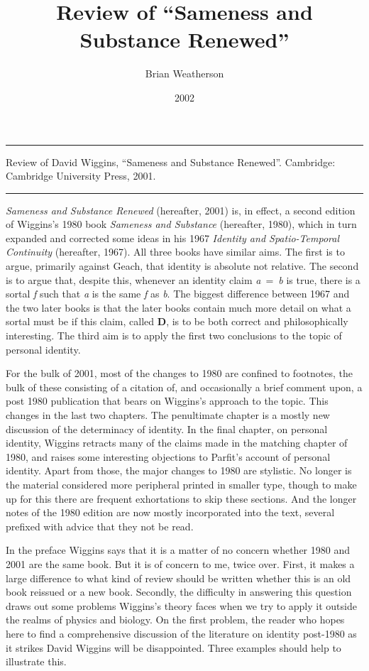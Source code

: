 \documentclass[
  10pt,
  letterpaper,
  DIV=11,
  numbers=noendperiod,
  twoside]{scrartcl}
\title{Review of ``Sameness and Substance Renewed''}
\author{Brian Weatherson}
\date{2002}
\renewenvironment{abstract}
 {\vspace{-1.25cm}
 \quotation\small\noindent\rule{\linewidth}{.5pt}\par\smallskip
 \noindent }
 {\par\noindent\rule{\linewidth}{.5pt}\endquotation}
\begin{document}
\maketitle
\begin{abstract}
Review of David Wiggins, ``Sameness and Substance Renewed''. Cambridge:
Cambridge University Press, 2001.
\end{abstract}


\emph{Sameness and Substance Renewed} (hereafter, 2001) is, in effect, a
second edition of Wiggins's 1980 book \emph{Sameness and Substance}
(hereafter, 1980), which in turn expanded and corrected some ideas in
his 1967 \emph{Identity and Spatio-Temporal Continuity} (hereafter,
1967). All three books have similar aims. The first is to argue,
primarily against Geach, that identity is absolute not relative. The
second is to argue that, despite this, whenever an identity claim
\emph{a}~=~\emph{b} is true, there is a sortal \emph{f} such that
\emph{a} is the same \emph{f} as \emph{b}. The biggest difference
between 1967 and the two later books is that the later books contain
much more detail on what a sortal must be if this claim, called
\textbf{D}, is to be both correct and philosophically interesting. The
third aim is to apply the first two conclusions to the topic of personal
identity.

For the bulk of 2001, most of the changes to 1980 are confined to
footnotes, the bulk of these consisting of a citation of, and
occasionally a brief comment upon, a post 1980 publication that bears on
Wiggins's approach to the topic. This changes in the last two chapters.
The penultimate chapter is a mostly new discussion of the determinacy of
identity. In the final chapter, on personal identity, Wiggins retracts
many of the claims made in the matching chapter of 1980, and raises some
interesting objections to Parfit's account of personal identity. Apart
from those, the major changes to 1980 are stylistic. No longer is the
material considered more peripheral printed in smaller type, though to
make up for this there are frequent exhortations to skip these sections.
And the longer notes of the 1980 edition are now mostly incorporated
into the text, several prefixed with advice that they not be read.

In the preface Wiggins says that it is a matter of no concern whether
1980 and 2001 are the same book. But it is of concern to me, twice over.
First, it makes a large difference to what kind of review should be
written whether this is an old book reissued or a new book. Secondly,
the difficulty in answering this question draws out some problems
Wiggins's theory faces when we try to apply it outside the realms of
physics and biology. On the first problem, the reader who hopes here to
find a comprehensive discussion of the literature on identity post-1980
as it strikes David Wiggins will be disappointed. Three examples should
help to illustrate this.
\end{document}
